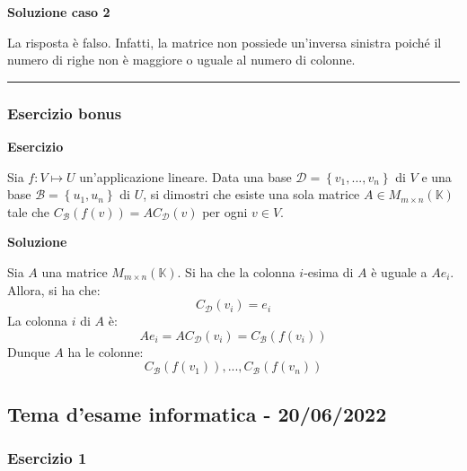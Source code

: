 \documentclass[a4paper]{article}
\newcommand{\longline}{\noindent\rule{\textwidth}{0.4pt}}
\begin{document}
	\noindent
	\textcolor{Green4}{\textbf{Soluzione caso 2}}\newline
	
	\noindent
	La risposta è falso. Infatti, la matrice non possiede un'inversa sinistra poiché il numero di righe non è maggiore o uguale al numero di colonne.
	
	\longline
	
	\subsubsection{Esercizio bonus}
	
	\textcolor{Red3}{\textbf{Esercizio}}\newline
	
	\noindent
	Sia $f: V \mapsto U$ un'applicazione lineare. Data una base $\mathcal{D} = \left\{v_{1}, ..., v_{n}\right\}$ di $V$ e una base $\mathcal{B} = \left\{u_{1}, u_{n}\right\}$ di $U$, si dimostri che esiste una sola matrice $A \in M_{m \times n}\left(\mathbb{K}\right)$ tale che $C_{\mathcal{B}}\left(f\left(v\right)\right) = AC_{\mathcal{D}}\left(v\right)$ per ogni $v \in V$.\newline
	
	\noindent
	\textcolor{Green4}{\textbf{Soluzione}}\newline
	
	\noindent
	Sia $A$ una matrice $M_{m \times n}\left(\mathbb{K}\right)$. Si ha che la colonna $i$-esima di $A$ è uguale a $Ae_{i}$. Allora, si ha che:
	\begin{equation*}
		C_{\mathcal{D}}\left(v_{i}\right) = e_{i}
	\end{equation*}
	La colonna $i$ di $A$ è:
	\begin{equation*}
		Ae_{i} = AC_{\mathcal{D}}\left(v_{i}\right) = C_{\mathcal{B}}\left(f\left(v_{i}\right)\right)
	\end{equation*}
	Dunque $A$ ha le colonne:
	\begin{equation*}
		C_{\mathcal{B}}\left(f\left(v_{1}\right)\right), ..., C_{\mathcal{B}}\left(f\left(v_{n}\right)\right)
	\end{equation*}\newpage

	\subsection{Tema d'esame informatica - 20/06/2022}
	
	\subsubsection{Esercizio 1}
	
\end{document}

